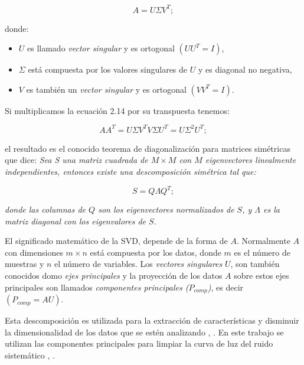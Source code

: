 \begin{equation}
  \displaystyle A=U\Sigma V^{T};
\end{equation}

\noindent donde:\\

\begin{itemize}
  \item $U$ es llamado \textit{vector singular} y es ortogonal $(UU^{T}=I)$,
  \item $\Sigma$ está compuesta por los valores singulares de $U$ y es diagonal no negativa,
  \item $V$ es también un \textit{vector singular} y es ortogonal $(VV^{T}=I)$.
\end{itemize}

Si multiplicamos la ecuación 2.14 por su transpuesta tenemos:

\begin{equation}
  \displaystyle AA^{T}=U\Sigma V^{T} V\Sigma U^{T} = U \Sigma^{2} U^{T};
\end{equation}

\noindent el resultado es el conocido teorema de diagonalización para matrices simétricas que dice: \textit{Sea S una matriz cuadrada de $M\times M$ con $M$ eigenvectores linealmente independientes, entonces existe una descomposición simétrica tal que:}

\begin{equation*}
  \displaystyle S=Q\Lambda Q^{T};
\end{equation*}


\noindent \textit{donde las columnas de $Q$ son los eigenvectores normalizados de $S$, y $\Lambda$ es la matriz diagonal con los eigenvalores de $S$.}

El significado matemático de la SVD, depende de la forma de $A$. Normalmente $A$ con dimensiones $m\times n$ está compuesta por los datos, donde $m$ es el número de muestras y $n$ el número de variables. Los \textit{vectores singulares} $U$, son también conocidos domo \textit{ejes principales} y la proyección de los datos $A$ sobre estos ejes principales son llamados \textit{componentes principales ($P_{comp}$)}, es decir $(P_{comp}=AU)$.

Esta descomposición es utilizada para la extracción de características y disminuir la dimensionalidad de los datos que se estén analizando \cite{mcgurk2010principal}, \cite{medeiros2018principal}. En este trabajo se utilizan las componentes principales para limpiar la curva de luz del ruido sistemático \cite{shin1999iterative}, \cite{bailey2012principal}.
